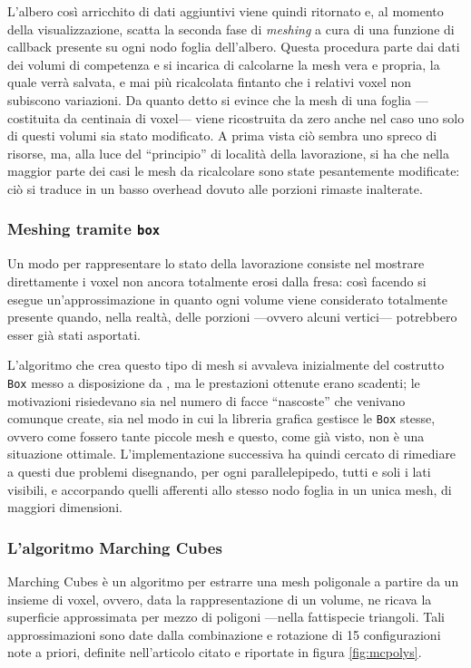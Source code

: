 L'albero così arricchito di dati aggiuntivi viene quindi ritornato e, al momento della visualizzazione, scatta la seconda fase di \emph{meshing} a cura di una funzione di callback presente su ogni nodo foglia dell'albero. Questa procedura parte dai dati dei volumi di competenza e si incarica di calcolarne la mesh vera e propria, la quale verrà salvata, e mai più ricalcolata fintanto che i relativi voxel non subiscono variazioni. Da quanto detto si evince che la mesh di una foglia ---costituita da centinaia di voxel--- viene ricostruita da zero anche nel caso uno solo di questi volumi sia stato modificato. A prima vista ciò sembra uno spreco di risorse, ma, alla luce del ``principio'' di località della lavorazione, si ha che nella maggior parte dei casi le mesh da ricalcolare sono state pesantemente modificate: ciò si traduce in un basso overhead dovuto alle porzioni rimaste inalterate.

\subsubsection{Meshing tramite \texttt{box}}
Un modo per rappresentare lo stato della lavorazione consiste nel mostrare direttamente i voxel non ancora totalmente erosi dalla fresa: così facendo si esegue un'approssimazione in quanto ogni volume viene considerato totalmente presente quando, nella realtà, delle porzioni ---ovvero alcuni vertici--- potrebbero esser già stati asportati.

L'algoritmo che crea questo tipo di mesh si avvaleva inizialmente del costrutto \texttt{Box} messo a disposizione da \osg, ma le prestazioni ottenute erano scadenti; le motivazioni risiedevano sia nel numero di facce ``nascoste'' che venivano comunque create, sia nel modo in cui la libreria grafica gestisce le \texttt{Box} stesse, ovvero come fossero tante piccole mesh e questo, come già visto, non è una situazione ottimale. L'implementazione successiva ha quindi cercato di rimediare a questi due problemi disegnando, per ogni parallelepipedo, tutti e soli i lati visibili, e accorpando quelli afferenti allo stesso nodo foglia in un unica mesh, di maggiori dimensioni.

\subsubsection{L'algoritmo Marching Cubes}
\label{mcalgo} Marching Cubes \cite{Lorensen:1987:MCH:37402.37422} è un algoritmo per estrarre una mesh poligonale a partire da un insieme di voxel, ovvero, data la rappresentazione di un volume, ne ricava la superficie approssimata per mezzo di poligoni ---nella fattispecie triangoli. Tali approssimazioni sono date dalla combinazione e rotazione di 15 configurazioni note a priori, definite nell'articolo citato e riportate in figura \ref{fig:mcpolys}.


